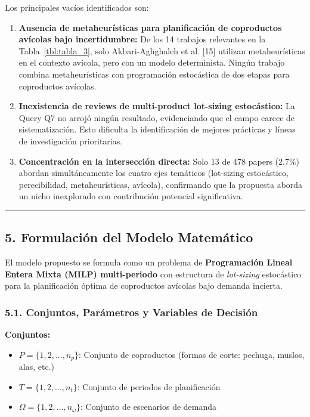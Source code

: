 \documentclass[
  spanish,
  12pt,
]{article}
\providecommand{\tightlist}{%
  \setlength{\itemsep}{0pt}\setlength{\parskip}{0pt}}
\begin{document}
Los principales vacíos identificados son:

\begin{enumerate}
\def\labelenumi{\arabic{enumi}.}
\item
  \textbf{Ausencia de metaheurísticas para planificación de coproductos
  avícolas bajo incertidumbre:} De los 14 trabajos relevantes en la
  Tabla~\ref{tbl:tabla_3}, solo Akbari-Aghghaleh et al. {[}15{]}
  utilizan metaheurísticas en el contexto avícola, pero con un modelo
  determinista. Ningún trabajo combina metaheurísticas con programación
  estocástica de dos etapas para coproductos avícolas.
\item
  \textbf{Inexistencia de reviews de multi-product lot-sizing
  estocástico:} La Query Q7 no arrojó ningún resultado, evidenciando que
  el campo carece de sistematización. Esto dificulta la identificación
  de mejores prácticas y líneas de investigación prioritarias.
\item
  \textbf{Concentración en la intersección directa:} Solo 13 de 478
  papers (2.7\%) abordan simultáneamente los cuatro ejes temáticos
  (lot-sizing estocástico, perecibilidad, metaheurísticas, avícola),
  confirmando que la propuesta aborda un nicho inexplorado con
  contribución potencial significativa.
\end{enumerate}

\begin{center}\rule{0.5\linewidth}{0.5pt}\end{center}

\subsection{5. Formulación del Modelo
Matemático}\label{formulaciuxf3n-del-modelo-matemuxe1tico}

El modelo propuesto se formula como un problema de \textbf{Programación
Lineal Entera Mixta (MILP) multi-periodo} con estructura de
\emph{lot-sizing} estocástico para la planificación óptima de
coproductos avícolas bajo demanda incierta.

\subsubsection{5.1. Conjuntos, Parámetros y Variables de
Decisión}\label{conjuntos-paruxe1metros-y-variables-de-decisiuxf3n}

\textbf{Conjuntos:}

\begin{itemize}
\tightlist
\item
  \(P = \{1, 2, ..., n_p\}\): Conjunto de coproductos (formas de corte:
  pechuga, muslos, alas, etc.)
\item
  \(T = \{1, 2, ..., n_t\}\): Conjunto de periodos de planificación
\item
  \(\Omega = \{1, 2, ..., n_\omega\}\): Conjunto de escenarios de
  demanda
\end{itemize}
\end{document}
